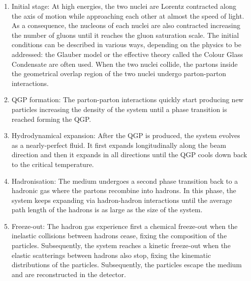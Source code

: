 \begin{enumerate}

\item Initial stage: At high energies, the two nuclei are Lorentz contracted along the axis of motion while approaching each other at almost the speed of light. As a consequence, the nucleons of each nuclei are also contracted increasing the number of gluons until it reaches the gluon saturation scale. The initial conditions can be described in various ways, depending on the physics to be addressed: the Glauber model or the effective theory called the Colour Glass Condensate are often used. When the two nuclei collide, the partons inside the geometrical overlap region of the two nuclei undergo parton-parton interactions.\\

\item QGP formation: The parton-parton interactions quickly start producing new particles increasing the density of the system until a phase transition is reached forming the QGP. \\

\item Hydrodynamical expansion: After the QGP is produced, the system evolves as a nearly-perfect fluid. It first expands longitudinally along the beam direction and then it expands in all directions until the QGP cools down back to the critical temperature. \\

\item Hadronisation: The medium undergoes a second phase transition back to a hadronic gas where the partons recombine into hadrons. In this phase, the system keeps expanding via hadron-hadron interactions until the average path length of the hadrons is as large as the size of the system. \\

\item Freeze-out: The hadron gas experience first a chemical freeze-out when the inelastic collisions between hadrons cease, fixing the composition of the particles. Subsequently, the system reaches a kinetic freeze-out when the elastic scatterings between hadrons also stop, fixing the kinematic distributions of the particles. Subsequently, the particles escape the medium and are reconstructed in  the detector.

\end{enumerate}

